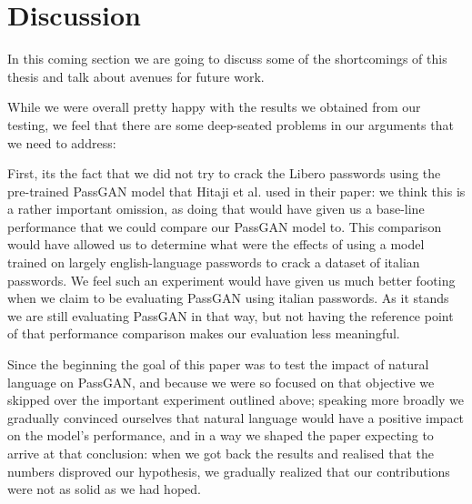 \section{Discussion}

In this coming section we are going to discuss some of the shortcomings of this thesis and talk about avenues for future work.

While we were overall pretty happy with the results we obtained from our testing, we feel that there are some deep-seated problems in our arguments that we need to address:

First, its the fact that we did not try to crack the Libero passwords using the pre-trained PassGAN model that Hitaji et al. \cite{PassGAN} used in their paper: we think this is a rather important omission, as doing that would have given us a base-line performance that we could compare our PassGAN model to.  This comparison would have allowed us to determine what were the effects of using a model trained on largely english-language passwords to crack a dataset of italian passwords. We feel such an experiment would have given us much better footing when we claim to be evaluating PassGAN using italian passwords. As it stands we are still evaluating PassGAN in that way, but not having the reference point of that performance comparison makes our evaluation less meaningful.

Since the beginning the goal of this paper was to test the impact of natural language on PassGAN, and because we were so focused on that objective we skipped over the important experiment outlined above; 
speaking more broadly we gradually convinced ourselves that natural language would have a positive impact on the model's performance, and in a way we shaped the paper expecting to arrive at that conclusion:
when we got back the results and realised that the numbers disproved our hypothesis, we gradually realized that our contributions were not as solid as we had hoped.

